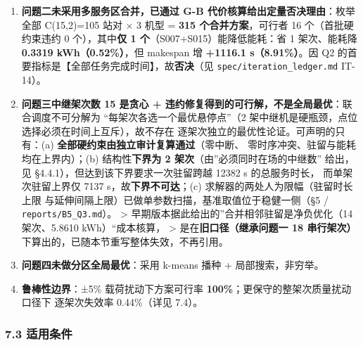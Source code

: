 \documentclass[
  10.5pt,
]{extarticle}
\providecommand{\tightlist}{%
  \setlength{\itemsep}{0pt}\setlength{\parskip}{0pt}}
\begin{document}
\begin{enumerate}
\def\labelenumi{\arabic{enumi}.}
\tightlist
\item
  \textbf{问题二未采用多服务区合并，已通过 G-B
  代价核算给出定量否决理由}：枚举全部 C(15,2)=105 站对 × 3 机型 =
  \textbf{315 个合并方案}，可行者 16 个（首批硬约束违约 0
  个），其中\textbf{仅 1 个}（S007+S015）能降低能耗：省 1 架次、能耗降
  \textbf{0.3319 kWh（0.52\%）}，但 makespan 增 \textbf{+1116.1
  s（8.91\%）}。因 Q2
  的首要指标是【全部任务完成时间】，故\textbf{否决}（见
  \texttt{spec/iteration\_ledger.md} IT-14）。
\item
  \textbf{问题三中继架次数 15 是贪心 +
  违约修复得到的可行解，不是全局最优}：联合调度不可分解为
  ``每架次各选一个最优悬停点''（2
  架中继机是硬瓶颈，点位选择必须在时间上互斥），故不存在
  逐架次独立的最优性论证。可声明的只有：(a)
  \textbf{全部硬约束由独立审计复算通过}（零中断、
  零时序冲突、驻留与能耗均在上界内）；(b) 结构性\textbf{下界为 2
  架次}（由''必须同时在场的中继数'' 给出，见
  §4.4.1），但达到该下界要求一次驻留跨越 12382 s 的总服务时长，
  而单架次驻留上界仅 7137 s，故\textbf{下界不可达}；(c)
  求解器的两处人为限幅（驻留时长上限
  与延伸间隔上限）已做单参数扫描，基准取值位于稳健一侧（§5 /
  \texttt{reports/B5\_Q3.md}）。 \textgreater{}
  早期版本据此给出的''合并相邻驻留是净负优化（14 架次、5.8610
  kWh）``成本核算， \textgreater{} 是在\textbf{旧口径（继承问题一 18
  串行架次）}下算出的，已随本节重写整体失效，不再引用。
\item
  \textbf{问题四未做分区全局最优}：采用 k-means 播种 +
  局部搜索，非穷举。
\item
  \textbf{鲁棒性边界}：±5\% 载荷扰动下方案可行率
  \textbf{100\%}；更保守的整架次质量扰动口径下 逐架次失效率 0.44\%（详见
  7.4）。
\end{enumerate}

\subsubsection{7.3 适用条件}\label{ux9002ux7528ux6761ux4ef6}
\end{document}
